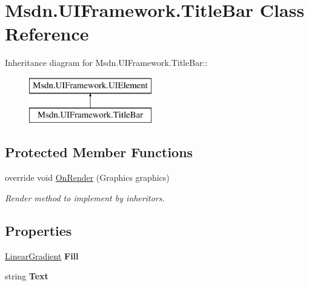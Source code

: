 \hypertarget{class_msdn_1_1_u_i_framework_1_1_title_bar}{
\section{Msdn.UIFramework.TitleBar Class Reference}
\label{class_msdn_1_1_u_i_framework_1_1_title_bar}
}
Inheritance diagram for Msdn.UIFramework.TitleBar::\begin{figure}[H]
\begin{center}
\leavevmode
\includegraphics[height=2cm]{class_msdn_1_1_u_i_framework_1_1_title_bar}
\end{center}
\end{figure}
\subsection*{Protected Member Functions}
\begin{DoxyCompactItemize}
\item 
override void \hyperlink{class_msdn_1_1_u_i_framework_1_1_title_bar_a55b0b153ab7d2b085e6731e3f6aaa55e}{OnRender} (Graphics graphics)
\begin{DoxyCompactList}\small\item\em Render method to implement by inheritors. \item\end{DoxyCompactList}\end{DoxyCompactItemize}
\subsection*{Properties}
\begin{DoxyCompactItemize}
\item 
\hypertarget{class_msdn_1_1_u_i_framework_1_1_title_bar_abd75c54d0458ac846922645cd855b053}{
\hyperlink{class_msdn_1_1_u_i_framework_1_1_linear_gradient}{LinearGradient} {\bfseries Fill}}
\label{class_msdn_1_1_u_i_framework_1_1_title_bar_abd75c54d0458ac846922645cd855b053}

\item 
\hypertarget{class_msdn_1_1_u_i_framework_1_1_title_bar_a9cb45bb550e7cd044558aae419ffdcf0}{
string {\bfseries Text}}
\label{class_msdn_1_1_u_i_framework_1_1_title_bar_a9cb45bb550e7cd044558aae419ffdcf0}

\end{DoxyCompactItemize}


